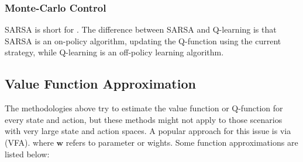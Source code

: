 \documentclass[10pt]{report}
\begin{document}
\subsubsection{Monte-Carlo Control}
SARSA is short for . The difference between SARSA and Q-learning is that SARSA is
an on-policy algorithm, updating the Q-function using the current strategy, while Q-learning is an off-policy learning algorithm.

\subsection{Value Function Approximation}

The methodologies above try to estimate the value function or Q-function for every state and action, but these methods might not apply to those
scenarios with very large state and action spaces. A popular approach for this issue is via (VFA).
where $\mathbf{w}$ refers to parameter or wights. Some function approximations are listed below:
\end{document}
